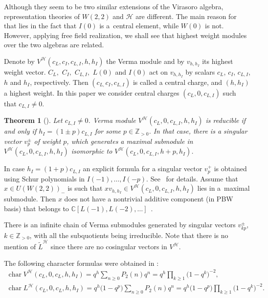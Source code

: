\documentclass[pdftex]{sigma}
\numberwithin{equation}{section}
\newtheorem{Theorem}{Theorem}[section]
\newcommand{\N}{{\mathbb Z}_{> 0} }
\newcommand{\C}{\mathbb C}
\newcommand{\HVir}{\mathcal H}
\DeclareMathOperator{\ch}{char}
\begin{document}
Although they seem to be two similar extensions of the Virasoro algebra, representation theories of $W(2,2)$ and $\HVir$ are dif\/ferent. The main reason for that lies in the fact that $I(0) $ is a~central element, while $W(0) $ is not. However, applying free f\/ield realization, we shall see that highest weight modules over the two algebras are related.

Denote by $V^{\HVir} ( c_{L},c_{I},c_{L,I},h,h_{I} ) $ the Verma module and by $v_{h,h_I}$ its highest weight vector. $C_{L},$ $C_{I},$ $C_{L,I},$ $L(0) $ and $I(0) $ act on $v_{h,h_I}$ by scalars $c_{L}$, $c_{I}$, $c_{L,I}$, $h$ and $h_{I}$, respectively. Then $\left(c_{L,}c_{I},c_{L,I}\right) $ is called a central charge, and $(h,h_{I}) $ a highest weight. In this paper we consider central charges $(c_{L},0,c_{L,I}) $ such that $c_{L,I}\neq0$.

\begin{Theorem}[\cite{Billig}]\label{billig}
Let $c_{L,I}\neq0$. Verma module $V^{\HVir}(c_{L},0,c_{L,I},h,h_{I}) $ is reducible if and only if $h_{I}=(1\pm p) c_{L,I}$ for some $p\in\N$. In that case, there is a singular vector $v_p^{\pm}$ of weight $p$, which generates a maximal submodule in $V^{\HVir} ( c_{L},0,c_{L,I},h,h_{I} ) $ isomorphic to $V^{\HVir} ( c_{L},0,c_{L,I},h+p,h_{I} ) $.
\end{Theorem}

\begin{Remark} \label{kompon}
In case $h_{I}=(1+p) c_{L,I}$ an explicit formula for a singular vector $v_p^+$ is obtained using Schur polynomials in $I(-1), \ldots, I(-p)$. See~\cite{nas} for details. Assume that $x \in U(W(2,2))_-$ is such that $xv_{h,h_I} \in V^{\HVir} ( c_{L},0,c_{L,I},h,h_{I} ) $ lies in a~maximal submodule. Then $x$ does not have a nontrivial additive component (in PBW basis) that belongs to $\C [ L(-1) ,L(-2), \ldots ]$~\cite{Billig}.
\end{Remark}

There is an inf\/inite chain of Verma submodules generated by singular vectors $v_{kp}^{\pm}$, $k\in\N$, with all the subquotients being irreducible. Note that there is no mention of $\widetilde{L}^{\HVir}$ since there are no cosingular vectors in $V^{\HVir}$.

The following character formulas were obtained in \cite{Billig}:
\begin{gather*}
\ch V^{\HVir}( c_{L},0,c_{L},h,h_{I}) =q^{h}\sum_{n\geq0}P_{2}(n)q^{n}=q^{h}\prod\limits_{k\geq1}\big(1-q^{k}\big)^{-2}, \\
\ch L^{\HVir} ( c_{L},0,c_{L},h,h_{I} ) =q^{h}\big(1-q^{p}\big)\sum_{n\geq0}P_{2}(n)q^{n} =q^{h}\big(1-q^{p}\big)\prod\limits_{k\geq1}\big(1-q^{k}\big)^{-2}.
\end{gather*}
\end{document}

